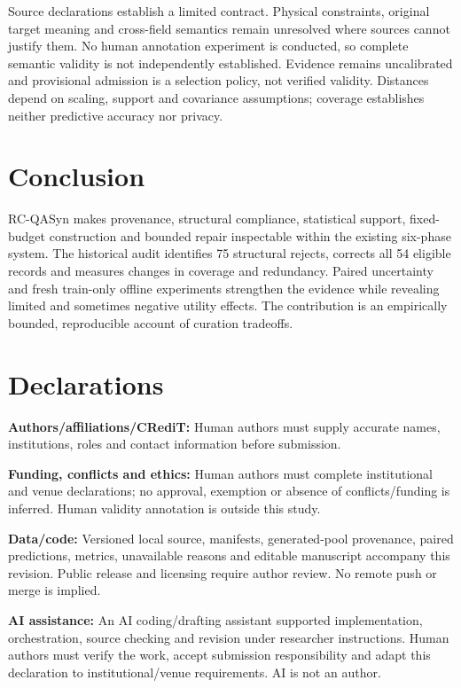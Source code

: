 Source declarations establish a limited contract. Physical constraints, original target meaning and cross-field semantics remain unresolved where sources cannot justify them. No human annotation experiment is conducted, so complete semantic validity is not independently established. Evidence remains uncalibrated and provisional admission is a selection policy, not verified validity. Distances depend on scaling, support and covariance assumptions; coverage establishes neither predictive accuracy nor privacy.

\section{Conclusion}
RC-QASyn makes provenance, structural compliance, statistical support, fixed-budget construction and bounded repair inspectable within the existing six-phase system. The historical audit identifies 75 structural rejects, corrects all 54 eligible records and measures changes in coverage and redundancy. Paired uncertainty and fresh train-only offline experiments strengthen the evidence while revealing limited and sometimes negative utility effects. The contribution is an empirically bounded, reproducible account of curation tradeoffs.

\section*{Declarations}
\textbf{Authors/affiliations/CRediT:} Human authors must supply accurate names, institutions, roles and contact information before submission.

\textbf{Funding, conflicts and ethics:} Human authors must complete institutional and venue declarations; no approval, exemption or absence of conflicts/funding is inferred. Human validity annotation is outside this study.

\textbf{Data/code:} Versioned local source, manifests, generated-pool provenance, paired predictions, metrics, unavailable reasons and editable manuscript accompany this revision. Public release and licensing require author review. No remote push or merge is implied.

\textbf{AI assistance:} An AI coding/drafting assistant supported implementation, orchestration, source checking and revision under researcher instructions. Human authors must verify the work, accept submission responsibility and adapt this declaration to institutional/venue requirements. AI is not an author.
